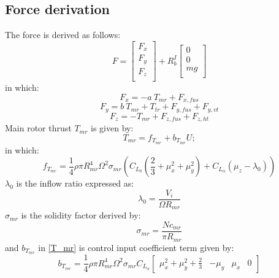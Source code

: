 \subsection{Force derivation} \label{force section}
The force is derived as follows:
\begin{equation}
	F= 
	\begin{bmatrix}
		F_x \\
		F_y\\
		F_z\\
	\end{bmatrix}
	+R_b^I \begin{bmatrix}
		0 \\
		0\\
		mg\\
	\end{bmatrix}
\end{equation}
in which:
\begin{equation}
	F_x=-a\ T_{mr}+F_{x,fus}
\end{equation}
\begin{equation}
	F_y=b\ T_{mr}+T_{tr}+F_{y,fus} + F_{y,vt}
\end{equation}
\begin{equation}
	F_z=-T_{mr}+F_{z,fus} + F_{z,ht}
\end{equation}
Main rotor thrust $T_{mr}$ is given by:
\begin{equation}
	T_{mr} = f_{T_{mr}}+b_{T_{mr}}U;
	\label{T_mr}
\end{equation}
in which:
\begin{equation}\label{f_t}
	f_{T_{mr}}= \frac{1}{4} \rho \pi R_{mr}^4\Omega^2\sigma_{mr}(C_{L_{0}}(\frac{2}{3}+\mu_x^2+\mu_y^2)+C_{L_{\alpha}}(\mu_z-\lambda_0))
\end{equation}
$\lambda_0$ is the inflow ratio expressed as:
\begin{equation}
	\lambda_0=\frac{V_i}{\Omega R_{mr}}
\end{equation}
$\sigma_{mr}$ is the solidity factor derived by:
\begin{equation}
	\sigma_{mr}=\frac{Nc_{mr}}{\pi R_{mr}}
\end{equation}
and $b_{T_{mr}}$ in \ref{T_mr} is control input coefficient term given by:
\begin{equation}\label{b_T}
	b_{T_{mr}}= \frac{1}{4} \rho \pi R_{mr}^4 \Omega^2 \sigma_{mr} C_{L_{\alpha}}\begin{bmatrix}
		\mu_x^2+\mu_y^2+\frac{2}{3}&
		-\mu_y&
		\mu_x&
		0
	\end{bmatrix}
\end{equation}
